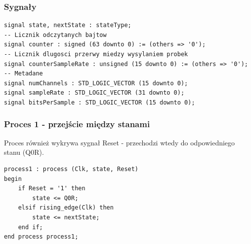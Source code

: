 \documentclass{article}
\begin{document}
\subsubsection{Sygnały}
\begin{lstlisting}[basicstyle=\small]
signal state, nextState : stateType;
-- Licznik odczytanych bajtow
signal counter : signed (63 downto 0) := (others => '0');
-- Licznik dlugosci przerwy miedzy wysylaniem probek
signal counterSampleRate : unsigned (15 downto 0) := (others => '0');
-- Metadane
signal numChannels : STD_LOGIC_VECTOR (15 downto 0);
signal sampleRate : STD_LOGIC_VECTOR (31 downto 0);
signal bitsPerSample : STD_LOGIC_VECTOR (15 downto 0);
\end{lstlisting}

\subsubsection{Proces 1 - przejście między stanami}
\par Proces również wykrywa sygnał Reset - przechodzi wtedy do odpowiedniego stanu (Q0R).
\begin{lstlisting}[basicstyle=\small]
process1 : process (Clk, state, Reset)
begin
	if Reset = '1' then
		state <= Q0R;
	elsif rising_edge(Clk) then
		state <= nextState;
	end if;
end process process1;
\end{lstlisting}

\newpage
\end{document}
